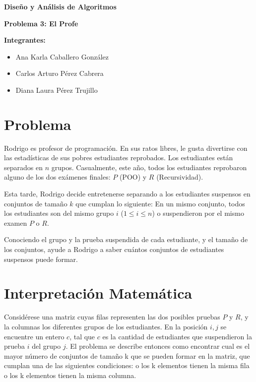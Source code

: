\documentclass{article}
\begin{document}
\begin{titlepage}
    \centering
{\bfseries\Huge Diseño y Análisis de Algoritmos \par}
\vspace{2cm}
{\bfseries\Large Problema 3: El Profe}
\vspace{2cm}

{\bfseries\Large Integrantes:}
\begin{center}
    \begin{itemize}
        \item Ana Karla Caballero González
        \item Carlos Arturo Pérez Cabrera
        \item Diana Laura Pérez Trujillo
    \end{itemize}
\end{center}


\end{titlepage}

\section{Problema}

Rodrigo es profesor de programación. En sus ratos libres, le gusta divertirse con las estadísticas de sus pobres estudiantes reprobados. Los estudiantes están separados en $n$ grupos. Casualmente, este año, todos los estudiantes reprobaron alguno de los dos exámenes finales: $P$ (POO) y $R$ (Recursividad).

Esta tarde, Rodrigo decide entretenerse separando a los estudiantes suspensos en conjuntos de tamaño $k$ que cumplan lo siguiente: En un mismo conjunto, todos los estudiantes son del mismo grupo $i$ ($1 \leq i \leq n$) o suspendieron por el mismo examen $P$ o $R$.

Conociendo el grupo y la prueba suspendida de cada estudiante, y el tamaño de los conjuntos, ayude a Rodrigo a saber cuántos conjuntos de estudiantes suspensos puede formar.

\section{Interpretación Matemática}

Considérese una matriz cuyas filas representen las dos posibles pruebas $P$ y $R$, y la columnas los diferentes grupos de los estudiantes. En la posición $i,j$ se encuentre un entero $c$, tal que $c$ es la cantidad de estudiantes que suspendieron la prueba $i$ del grupo $j$. El problema se describe entonces como encontrar cual es el mayor número de conjuntos de tamaño k que se pueden formar en la matriz, que cumplan una de las siguientes condiciones: o los k elementos tienen la misma fila o los k elementos tienen la misma columna.
\end{document}
